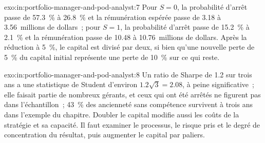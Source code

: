 \begin{solution}{exo:in:portfolio-manager-and-pod-analyst:7}
Pour $S=0$, la probabilité d'arrêt passe de 57.3~\% à 26.8~\% et la rémunération espérée passe de 3.18 à 3.56~millions de dollars~; pour
$S=1$, la probabilité d'arrêt passe de 15.2~\% à 2.1~\% et la rémunération passe de 10.48 à 10.76~millions de dollars. Après la réduction à
5~\%, le capital est divisé par deux, si bien qu'une nouvelle perte de 5~\% du capital initial représente une perte de 10~\% sur ce qui reste.
\end{solution}

\begin{solution}{exo:in:portfolio-manager-and-pod-analyst:8}
Un ratio de Sharpe de 1.2 sur trois ans a une statistique de Student d'environ $1.2\sqrt3=2.08$, à peine significative~; elle faisait partie de
nombreux gérants, et ceux qui ont été arrêtés ne figurent pas dans l'échantillon~; 43~\% des ancienneté sans compétence survivent à trois ans dans
l'exemple du chapitre. Doubler le capital modifie aussi les coûts de la stratégie et sa capacité. Il faut examiner le processus, le risque pris
et le degré de concentration du résultat, puis augmenter le capital par paliers.
\end{solution}

